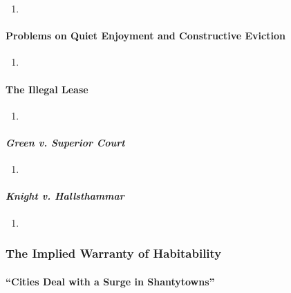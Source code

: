 \begin{enumerate}
    \item %
\end{enumerate}

\paragraph{Problems on Quiet Enjoyment and Constructive Eviction}

\begin{enumerate}
    \item %
\end{enumerate}

\paragraph{The Illegal Lease}

\begin{enumerate}
    \item %
\end{enumerate}

\paragraph{\emph{Green v. Superior Court}}

\begin{enumerate}
    \item %
\end{enumerate}

\paragraph{\emph{Knight v. Hallsthammar}}

\begin{enumerate}
    \item %
\end{enumerate}

\subsubsection{The Implied Warranty of Habitability}


\paragraph{``Cities Deal with a Surge in Shantytowns''}

